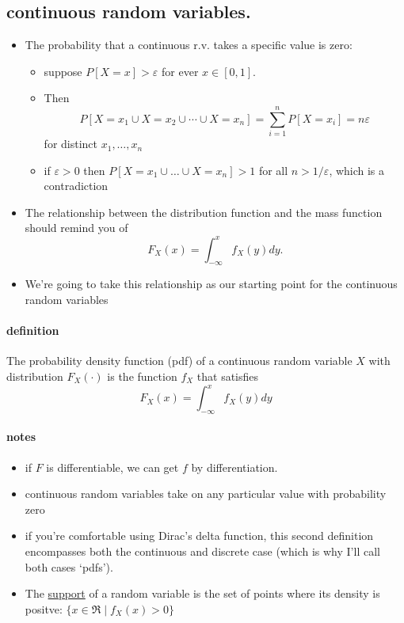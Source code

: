 \subsection{continuous random variables.}

\begin{itemize}
\item The probability that a continuous r.v. takes a specific value
       is zero:
\begin{itemize}
\item suppose $P[X = x] > \varepsilon$ for ever $x \in [0,1]$.
\item Then \[P[X=x_1 \cup X = x_2 \cup \cdots \cup X = x_n] =
         \sum_{i=1}^n P[X = x_i] = n \varepsilon\] for distinct $x_1,\dots,x_n$
\item if $\varepsilon > 0$ then $P[X = x_1 \cup \dots \cup X
         = x_n] > 1$ for all $n > 1/\varepsilon$, which is a contradiction
\end{itemize}
\item The relationship between the distribution function and the mass
       function should remind you of \[ F_X(x) = \int_{ -\infty}^{x}
       f_X(y) dy.\]
\item We're going to take this relationship as our starting point for
       the continuous random variables
\end{itemize}

\paragraph{definition}

      The probability density function (pdf) of a continuous random
      variable $X$ with distribution $F_X(\cdot)$ is the function $f_X$
      that satisfies \[ F_X(x) = \int_{-\infty}^{x} f_X(y) dy\]

\paragraph{notes}

\begin{itemize}
\item if $F$ is differentiable, we can get $f$ by differentiation.
\item continuous random variables take on any particular value
        with probability zero
\item if you're comfortable using Dirac's delta function, this second
        definition encompasses both the continuous and discrete case
        (which is why I'll call both cases `pdfs').
\item The \underline{support} of a random variable is the set of points where
        its density is positve: $\{x \in \Re \mid f_X(x) > 0\}$
\end{itemize}

